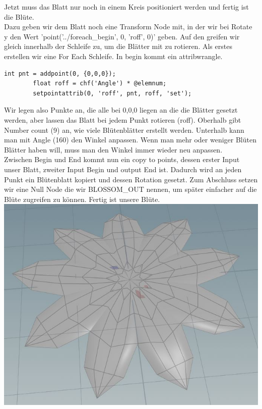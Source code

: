 \documentclass[paper=a4,fontsize=12pt,ngerman]{scrartcl}
\begin{document}
	Jetzt muss das Blatt nur noch in einem Kreis positioniert werden und fertig ist die Blüte.\\
	Dazu geben wir dem Blatt noch eine Transform Node mit, in der wir bei Rotate y den Wert 'point('../foreach\_begin', 0, 'roff', 0)' geben. Auf den greifen wir gleich innerhalb der Schleife zu, um die Blätter mit zu rotieren.
	Als erstes erstellen wir eine For Each Schleife. In begin kommt ein attribwrangle.
	\begin{lstlisting}[basicstyle=\scriptsize]
		int pnt = addpoint(0, {0,0,0});
		float roff = chf('Angle') * @elemnum;
		setpointattrib(0, 'roff', pnt, roff, 'set');
	\end{lstlisting} 
	Wir legen also Punkte an, die alle bei 0,0,0 liegen an die die Blätter gesetzt werden, aber lassen das Blatt bei jedem Punkt rotieren (roff). Oberhalb gibt Number count (9) an, wie viele Blütenblätter erstellt werden. Unterhalb kann man mit Angle (160) den Winkel anpassen. Wenn man mehr oder weniger Blüten Blätter haben will, muss man den Winkel immer wieder neu anpassen.\\ 
	Zwischen Begin und End kommt nun ein copy to points, dessen erster Input unser Blatt, zweiter Input Begin und output End ist. Dadurch wird an jeden Punkt ein Blütenblatt kopiert und dessen Rotation gesetzt. 
	Zum Abschluss setzen wir eine Null Node die wir BLOSSOM\_OUT nennen, um später einfacher auf die Blüte zugreifen zu können. Fertig ist unsere Blüte.\\
	\includegraphics*[scale=0.45]{graphics/blossom4.JPG}
	
\end{document}
